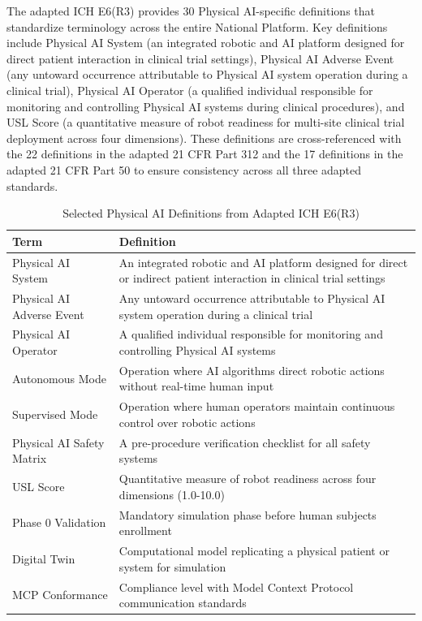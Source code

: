 The adapted ICH E6(R3) provides 30 Physical AI-specific definitions that
standardize terminology across the entire National Platform. Key definitions
include Physical AI System (an integrated robotic and AI platform designed for
direct patient interaction in clinical trial settings), Physical AI Adverse
Event (any untoward occurrence attributable to Physical AI system operation
during a clinical trial), Physical AI Operator (a qualified individual
responsible for monitoring and controlling Physical AI systems during clinical
procedures), and USL Score (a quantitative measure of robot readiness for
multi-site clinical trial deployment across four dimensions). These definitions
are cross-referenced with the 22 definitions in the adapted 21 CFR Part 312
\cite{cfr312-adapt} and the 17 definitions in the adapted 21 CFR Part 50
\cite{cfr50-adapt} to ensure consistency across all three adapted standards.

\begin{table}[H]
\centering
\caption{Selected Physical AI Definitions from Adapted ICH E6(R3)}
\label{tab:ich-definitions}
\small
\begin{tabularx}{\textwidth}{l X}
\toprule
\textbf{Term} & \textbf{Definition} \\
\midrule
Physical AI System & An integrated robotic and AI platform designed for direct or indirect patient interaction in clinical trial settings \\
Physical AI Adverse Event & Any untoward occurrence attributable to Physical AI system operation during a clinical trial \\
Physical AI Operator & A qualified individual responsible for monitoring and controlling Physical AI systems \\
Autonomous Mode & Operation where AI algorithms direct robotic actions without real-time human input \\
Supervised Mode & Operation where human operators maintain continuous control over robotic actions \\
Physical AI Safety Matrix & A pre-procedure verification checklist for all safety systems \\
USL Score & Quantitative measure of robot readiness across four dimensions (1.0-10.0) \\
Phase 0 Validation & Mandatory simulation phase before human subjects enrollment \\
Digital Twin & Computational model replicating a physical patient or system for simulation \\
MCP Conformance & Compliance level with Model Context Protocol communication standards \\
\bottomrule
\end{tabularx}
\end{table}

